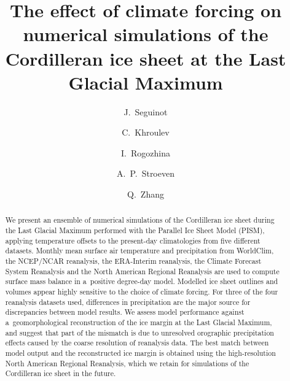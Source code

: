 \documentclass[tc, ms]{copernicus}
\begin{document}
\hack{\sloppy}

\title{The effect of climate forcing on numerical simulations of the Cordilleran ice sheet at the Last Glacial Maximum}

\author[1]{J.~Seguinot}
\author[2]{C.~Khroulev}
\author[3]{I.~Rogozhina}
\author[1]{A.~P.~Stroeven}
\author[1]{Q.~Zhang}



\published{}

\maketitle

\begin{abstract}
  We present an ensemble of numerical simulations of the Cordilleran ice sheet during the Last Glacial Maximum performed with the Parallel Ice Sheet Model (PISM), applying temperature offsets to the present-day climatologies from five different datasets. Monthly mean surface air temperature and precipitation from WorldClim, the NCEP/NCAR reanalysis, the ERA-Interim reanalysis, the Climate Forecast System Reanalysis and the North American Regional Reanalysis are used to compute surface mass balance in a~positive degree-day model. Modelled ice sheet outlines and volumes appear highly sensitive to the choice of climate forcing. For three of the four reanalysis datasets used, differences in precipitation are the major source for discrepancies between model results. We assess model performance against a~geomorphological reconstruction of the ice margin at the Last Glacial Maximum, and suggest that part of the mismatch is due to unresolved orographic precipitation effects caused by the coarse resolution of reanalysis data. The best match between model output and the reconstructed ice margin is obtained using the high-resolution North American Regional Reanalysis, which we retain for simulations of the Cordilleran ice sheet in the future.
\end{abstract}
\end{document}
